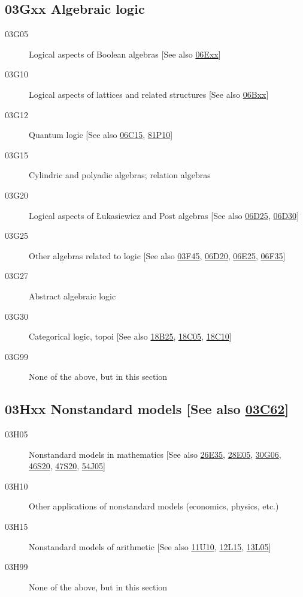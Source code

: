 \subsection*{03Gxx  Algebraic logic }\label{03Gxx}
\begin{description}
\item [03G05]\label{03G05} Logical aspects of Boolean algebras [See also \hyperref[06Exx]{06Exx}]
\item [03G10]\label{03G10} Logical aspects of lattices and related structures [See also \hyperref[06Bxx]{06Bxx}]
\item [03G12]\label{03G12} Quantum logic [See also \hyperref[06C15]{06C15}, \hyperref[81P10]{81P10}]
\item [03G15]\label{03G15} Cylindric and polyadic algebras; relation algebras
\item [03G20]\label{03G20} Logical aspects of \L ukasiewicz and Post algebras [See also \hyperref[06D25]{06D25}, \hyperref[06D30]{06D30}]
\item [03G25]\label{03G25} Other algebras related to logic [See also \hyperref[03F45]{03F45}, \hyperref[06D20]{06D20}, \hyperref[06E25]{06E25}, \hyperref[06F35]{06F35}]
\item [03G27]\label{03G27} Abstract algebraic logic
\item [03G30]\label{03G30} Categorical logic, topoi [See also \hyperref[18B25]{18B25}, \hyperref[18C05]{18C05}, \hyperref[18C10]{18C10}]
\item [03G99]\label{03G99} None of the above, but in this section
\end{description}
\subsection*{03Hxx  Nonstandard models [See also \hyperref[03C62]{03C62}] }\label{03Hxx}
\begin{description}
\item [03H05]\label{03H05} Nonstandard models in mathematics [See also \hyperref[26E35]{26E35}, \hyperref[28E05]{28E05}, \hyperref[30G06]{30G06}, \hyperref[46S20]{46S20}, \hyperref[47S20]{47S20}, \hyperref[54J05]{54J05}]
\item [03H10]\label{03H10} Other applications of nonstandard models (economics, physics, etc.)
\item [03H15]\label{03H15} Nonstandard models of arithmetic [See also \hyperref[11U10]{11U10}, \hyperref[12L15]{12L15}, \hyperref[13L05]{13L05}]
\item [03H99]\label{03H99} None of the above, but in this section
\end{description}
